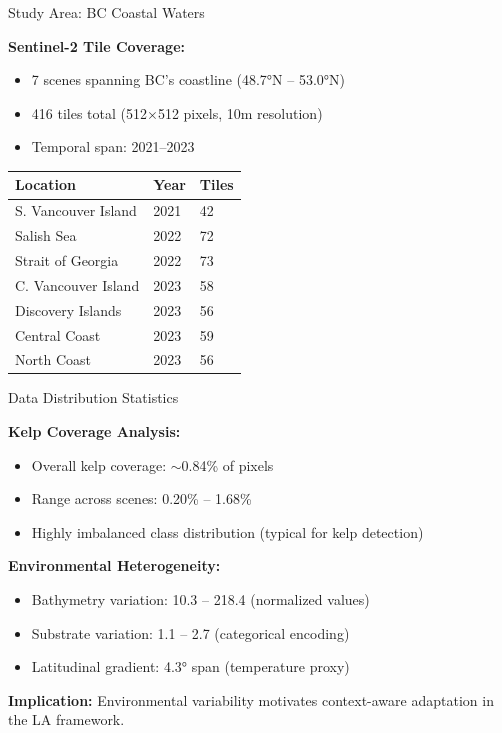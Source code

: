 \documentclass[10pt,xcolor={table,dvipsnames},t]{beamer}
\begin{document}
\begin{frame}{Study Area: BC Coastal Waters}

\textbf{Sentinel-2 Tile Coverage:}
\begin{itemize}
  \item 7 scenes spanning BC's coastline (48.7°N -- 53.0°N)
  \item 416 tiles total (512$\times$512 pixels, 10m resolution)
  \item Temporal span: 2021--2023
\end{itemize}

\vspace{0.5em}
\begin{table}[h]
\small
\begin{tabular}{lll}
\toprule
\textbf{Location} & \textbf{Year} & \textbf{Tiles} \\
\midrule
S. Vancouver Island & 2021 & 42 \\
Salish Sea & 2022 & 72 \\
Strait of Georgia & 2022 & 73 \\
C. Vancouver Island & 2023 & 58 \\
Discovery Islands & 2023 & 56 \\
Central Coast & 2023 & 59 \\
North Coast & 2023 & 56 \\
\bottomrule
\end{tabular}
\end{table}

\end{frame}

\begin{frame}{Data Distribution Statistics}

\textbf{Kelp Coverage Analysis:}
\begin{itemize}
  \item Overall kelp coverage: $\sim$0.84\% of pixels
  \item Range across scenes: 0.20\% -- 1.68\%
  \item Highly imbalanced class distribution (typical for kelp detection)
\end{itemize}

\vspace{0.5em}
\textbf{Environmental Heterogeneity:}
\begin{itemize}
  \item Bathymetry variation: 10.3 -- 218.4 (normalized values)
  \item Substrate variation: 1.1 -- 2.7 (categorical encoding)
  \item Latitudinal gradient: 4.3° span (temperature proxy)
\end{itemize}

\vspace{0.5em}
\textbf{Implication:} Environmental variability motivates context-aware adaptation in the LA framework.

\end{frame}
\end{document}
